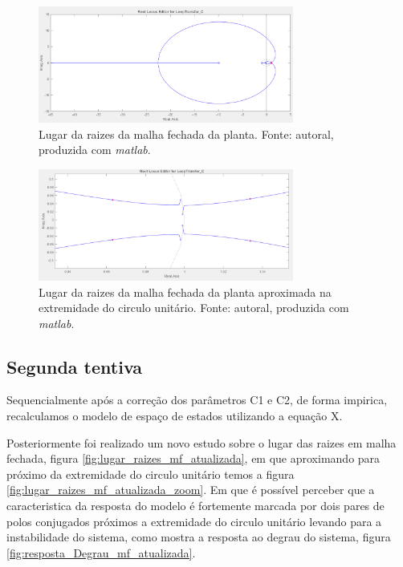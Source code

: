 \documentclass{ifacconf}
\begin{document}
\begin{figure}[!htb]
  \begin{center}
  \includegraphics[width=8.4cm]{figures/lugar_raizes_mf.png}    %
  \caption{Lugar da raizes da malha fechada da planta. Fonte: autoral, produzida com \textit{matlab}.} 
  \label{fig:lugar_raizes_mf}
  \end{center}
\end{figure}

\begin{figure}[!htb]
  \begin{center}
  \includegraphics[width=8.4cm]{figures/lugar_raizes_mf_aproximada.png}    %
  \caption{Lugar da raizes da malha fechada da planta aproximada na extremidade do circulo unitário. Fonte: autoral, produzida com \textit{matlab}.} 
  \label{fig:lugar_raizes_mf_aproximada}
  \end{center}
\end{figure}

\subsection{Segunda tentiva} %
Sequencialmente após a correção dos parâmetros C1 e C2, de forma impirica, recalculamos o modelo de espaço de estados utilizando a equação X.

Posteriormente foi realizado um novo estudo sobre o lugar das raizes em malha fechada, figura \ref{fig:lugar_raizes_mf_atualizada}, em que
aproximando para próximo da extremidade do circulo unitário temos a figura \ref{fig:lugar_raizes_mf_atualizada_zoom}. 
Em que é possível perceber que a caracteristica da resposta do modelo é fortemente marcada por dois pares de polos conjugados
próximos a extremidade do circulo unitário levando para a instabilidade do sistema, como mostra a resposta ao degrau do sistema, figura \ref{fig:resposta_Degrau_mf_atualizada}.
\end{document}
